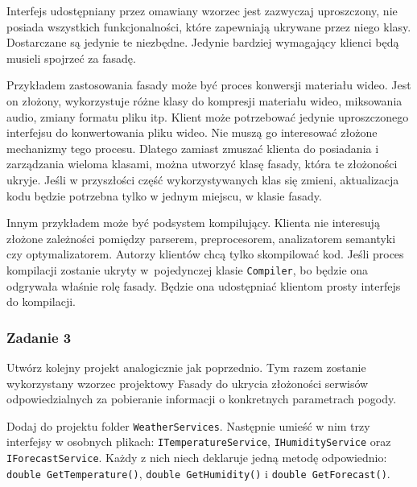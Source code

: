 Interfejs udostępniany przez omawiany wzorzec jest zazwyczaj uproszczony, nie posiada wszystkich funkcjonalności, które zapewniają ukrywane przez niego klasy. Dostarczane są jedynie te niezbędne. Jedynie bardziej wymagający klienci będą musieli spojrzeć za fasadę.

Przykładem zastosowania fasady może być proces konwersji materiału wideo. Jest on złożony, wykorzystuje różne klasy do kompresji materiału wideo, miksowania audio, zmiany formatu pliku itp. Klient może potrzebować jedynie uproszczonego interfejsu do konwertowania pliku wideo. Nie muszą go interesować złożone mechanizmy tego procesu. Dlatego zamiast zmuszać klienta do posiadania i zarządzania wieloma klasami, można utworzyć klasę fasady, która te złożoności ukryje. Jeśli w przyszłości część wykorzystywanych klas się zmieni, aktualizacja kodu będzie potrzebna tylko w jednym miejscu, w klasie fasady.

Innym przykładem może być podsystem kompilujący. Klienta nie interesują złożone zależności pomiędzy parserem, preprocesorem, analizatorem semantyki czy optymalizatorem. Autorzy klientów chcą tylko skompilować kod. Jeśli proces kompilacji zostanie ukryty w~pojedynczej klasie \texttt{Compiler}, bo będzie ona odgrywała właśnie rolę fasady. Będzie ona udostępniać klientom prosty interfejs do kompilacji.

\subsubsection{Zadanie 3}

Utwórz kolejny projekt analogicznie jak poprzednio. Tym razem zostanie wykorzystany wzorzec projektowy Fasady do ukrycia złożoności serwisów odpowiedzialnych za pobieranie informacji o konkretnych parametrach pogody.

Dodaj do projektu folder \texttt{WeatherServices}. Następnie umieść w nim trzy interfejsy w osobnych plikach: \texttt{ITemperatureService}, \texttt{IHumidityService} oraz \texttt{IForecastService}. Każdy z nich niech deklaruje jedną metodę odpowiednio: \texttt{double GetTemperature()}, \texttt{double GetHumidity()} i \texttt{double GetForecast()}. 

